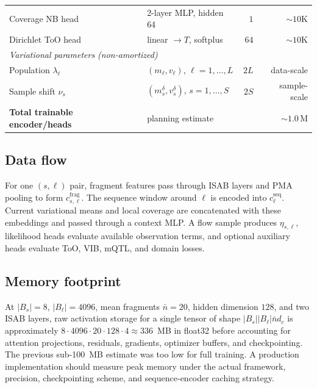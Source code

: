 \begin{table}[htbp]
{\begin{tabular}{llrr}
\quad Coverage NB head & 2-layer MLP, hidden 64 & $1$ & $\sim 10$K \\
\quad Dirichlet ToO head & linear $\to T$, softplus & $64$ & $\sim 10$K \\
\midrule
\multicolumn{4}{l}{\emph{Variational parameters (non-amortized)}} \\
\quad Population $\lambda_\ell$ & $(m_\ell,v_\ell)$, $\ell=1,\dots,L$ & $2L$ & data-scale \\
\quad Sample shift $\nu_s$ & $(m_s^\delta,v_s^\delta)$, $s=1,\dots,S$ & $2S$ & sample-scale \\
\midrule
\textbf{Total trainable encoder/heads} & planning estimate & & $\sim 1.0\,\text{M}$ \\
\bottomrule
\end{tabular}%
}
\end{table}

\subsection*{Data flow}
For one $(s,\ell)$ pair, fragment features pass through ISAB layers and PMA pooling to form $c^{\mathrm{frag}}_{s,\ell}$. The sequence window around $\ell$ is encoded into $c^{\mathrm{seq}}_\ell$. Current variational means and local coverage are concatenated with these embeddings and passed through a context MLP. A flow sample produces $\eta_{s,\ell}$, likelihood heads evaluate available observation terms, and optional auxiliary heads evaluate ToO, VIB, mQTL, and domain losses.

\subsection*{Memory footprint}
At $|B_s|=8$, $|B_\ell|=4096$, mean fragments $\bar n=20$, hidden dimension $128$, and two ISAB layers, raw activation storage for a single tensor of shape $|B_s||B_\ell|\bar n d_c$ is approximately $8\cdot4096\cdot20\cdot128\cdot4\approx 336$~MB in float32 before accounting for attention projections, residuals, gradients, optimizer buffers, and checkpointing. The previous sub-100~MB estimate was too low for full training. A production implementation should measure peak memory under the actual framework, precision, checkpointing scheme, and sequence-encoder caching strategy.
